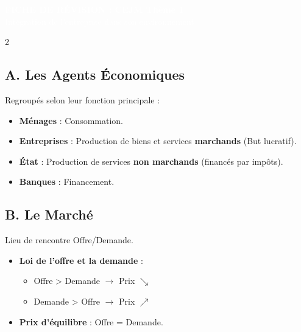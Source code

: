 \documentclass[a4paper,10pt]{article}
\newcommand{\notion}[1]{\textbf{\textcolor{mainBlue}{#1}}}
\begin{document}
\begin{center}
    \colorbox{mainBlue}{\parbox{\dimexpr\textwidth-2\fboxsep}{
        \centering
        \vspace{0.2cm}
        {\Huge \textbf{\textcolor{white}{FICHE DE RÉVISION : CEJM Thème 1}}} \\
        \vspace{0.1cm}
        {\Large \textcolor{white}{Intégration de l'entreprise dans son environnement}}
        \vspace{0.2cm}
    }}
\end{center}
\vspace{0.3cm}

\begin{tcolorbox}[title=1. ÉCONOMIE : Agents et Marchés]
    \begin{multicols}{2}
        
    \subsection*{A. Les Agents Économiques}
    Regroupés selon leur fonction principale :
    \begin{itemize}[leftmargin=*]
        \item \notion{Ménages} : Consommation.
        \item \notion{Entreprises} : Production de biens et services \textbf{marchands} (But lucratif).
        \item \notion{État} : Production de services \textbf{non marchands} (financés par impôts).
        \item \notion{Banques} : Financement.
    \end{itemize}

    \subsection*{B. Le Marché}
    Lieu de rencontre Offre/Demande.
    \begin{itemize}[leftmargin=*]
        \item \notion{Loi de l'offre et la demande} :
        \begin{itemize}
            \item Offre > Demande $\rightarrow$ Prix $\searrow$
            \item Demande > Offre $\rightarrow$ Prix $\nearrow$
        \end{itemize}
        \item \notion{Prix d'équilibre} : Offre = Demande.
    \end{itemize}


\end{multicols}
\end{tcolorbox}
\end{document}
